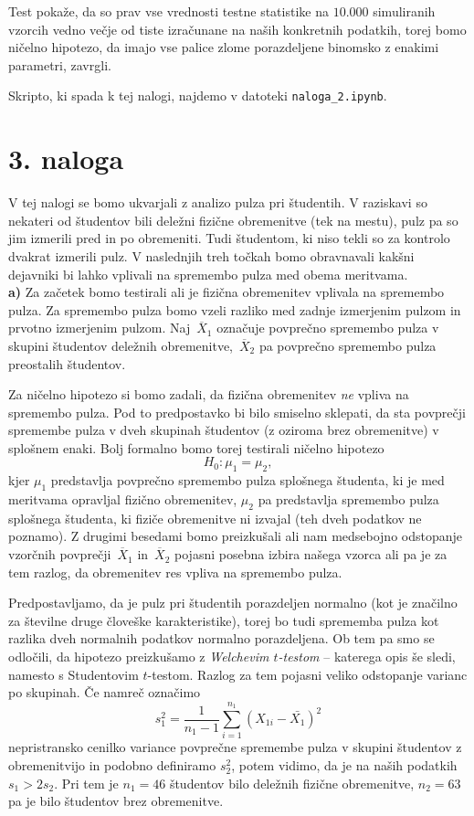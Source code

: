 \documentclass[a4paper,11pt]{article}
\newcommand{\olsi}[1]{\,\overline{\!{#1}}} %
\begin{document}
Test pokaže, da so prav vse vrednosti testne statistike na $10.000$ simuliranih vzorcih vedno večje od tiste izračunane na naših konkretnih podatkih, torej bomo ničelno hipotezo, da imajo vse palice zlome porazdeljene binomsko z enakimi parametri, zavrgli.

Skripto, ki spada k tej nalogi, najdemo v datoteki \texttt{naloga\_2.ipynb}.

\section*{3. naloga}

V tej nalogi se bomo ukvarjali z analizo pulza pri študentih. V raziskavi so nekateri od študentov bili deležni fizične obremenitve (tek na mestu), pulz pa so jim izmerili pred in po obremeniti. Tudi študentom, ki niso tekli so za kontrolo dvakrat izmerili pulz. V naslednjih treh točkah bomo obravnavali kakšni dejavniki bi lahko vplivali na spremembo pulza med obema meritvama.
\\

\noindent
\textbf{a)} Za začetek bomo testirali ali je fizična obremenitev vplivala na spremembo pulza. Za spremembo pulza bomo vzeli razliko med zadnje izmerjenim pulzom in prvotno izmerjenim pulzom. Naj $\olsi{X}_1$ označuje povprečno spremembo pulza v skupini študentov deležnih obremenitve, $\olsi{X}_2$ pa povprečno spremembo pulza preostalih študentov. 

Za ničelno hipotezo si bomo zadali, da fizična obremenitev \emph{ne} vpliva na spremembo pulza. Pod to predpostavko bi bilo smiselno sklepati, da sta povprečji spremembe pulza v dveh skupinah študentov (z oziroma brez obremenitve) v splošnem enaki. Bolj formalno bomo torej testirali ničelno hipotezo
\[
    H_0 : \mu_1 = \mu_2,
\]
kjer $\mu_1$ predstavlja povprečno spremembo pulza splošnega študenta, ki je med meritvama opravljal fizično obremenitev, $\mu_2$ pa predstavlja spremembo pulza splošnega študenta, ki fiziče obremenitve ni izvajal (teh dveh podatkov ne poznamo). Z drugimi besedami bomo preizkušali ali nam medsebojno odstopanje vzorčnih povprečji $\olsi{X}_1$ in $\olsi{X}_2$ pojasni posebna izbira našega vzorca ali pa je za tem razlog, da obremenitev res vpliva na spremembo pulza. 

Predpostavljamo, da je pulz pri študentih porazdeljen normalno (kot je značilno za številne druge človeške karakteristike), torej bo tudi sprememba pulza kot razlika dveh normalnih podatkov normalno porazdeljena. Ob tem pa smo se odločili, da hipotezo preizkušamo z \emph{Welchevim $t$-testom} -- katerega opis še sledi, namesto s Studentovim $t$-testom. 
Razlog za tem pojasni veliko odstopanje varianc po skupinah. Če namreč označimo
\[
    s_1^2 = \frac{1}{n_1 - 1}\sum_{i = 1}^{n_1} (X_{1i} - \bar{X_1})^2
\]
nepristransko cenilko variance povprečne spremembe pulza v skupini študentov z obremenitvijo in podobno definiramo $s_2^2$, potem vidimo, da je na naših podatkih $s_1 > 2s_2$. Pri tem je $n_1 = 46$ študentov bilo deležnih fizične obremenitve, $n_2 = 63$ pa je bilo študentov brez obremenitve. 
\end{document}
